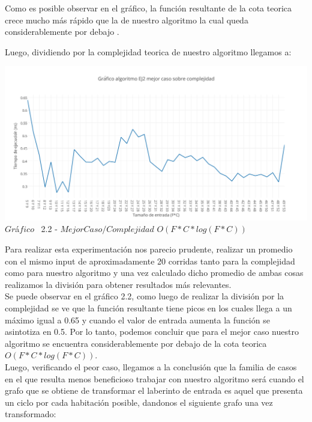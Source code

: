 Como es posible observar en el gr\'afico, la funci\'on resultante de la cota teorica crece mucho m\'as r\'apido que la de nuestro algoritmo la cual queda considerablemente por debajo .

Luego, dividiendo por la complejidad teorica de nuestro algoritmo llegamos a:\\

\vspace*{0.3cm} \vspace*{0.3cm}
  \begin{center}
\includegraphics[scale=0.65]{./EJ2/mejorcaso1.png}
{$Gr$\'a$fico$ \ 2.2 - $Mejor Caso / Complejidad$ $O(F*C* log(F*C))$}
  \end{center}
  \vspace*{0.3cm}

Para realizar esta experimentaci\'on nos parecio prudente, realizar un promedio con el mismo input de aproximadamente 20 corridas
tanto para la complejidad como para nuestro algoritmo y una vez calculado dicho promedio de ambas cosas realizamos la divisi\'on para
obtener resultados m\'as relevantes.\\ 

Se puede observar en el gr\'afico 2.2, como luego de realizar la divisi\'on por la complejidad se ve que la funci\'on resultante tiene picos en los cuales llega a un m\'aximo igual a 0.65 y cuando el valor de entrada aumenta la funci\'on se asintotiza en 0.5. Por lo tanto, podemos concluir que para el mejor caso nuestro algoritmo se encuentra considerablemente por debajo de la cota teorica $O(F*C* log(F*C))$.\\

Luego, verificando el peor caso, llegamos a la conclusi\'on que la familia de casos en el que resulta menos beneficioso trabajar con nuestro algoritmo ser\'a cuando el grafo que se obtiene de transformar el laberinto de entrada es aquel que presenta un ciclo por cada habitaci\'on posible, dandonos el siguiente grafo una vez transformado:\\


